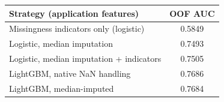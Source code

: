 \begin{tabular}{lc}
\toprule
Strategy (application features) & OOF AUC\\
\midrule
Missingness indicators only (logistic) & 0.5849\\
Logistic, median imputation & 0.7493\\
Logistic, median imputation + indicators & 0.7505\\
LightGBM, native NaN handling & 0.7686\\
LightGBM, median-imputed & 0.7684\\
\bottomrule
\end{tabular}

